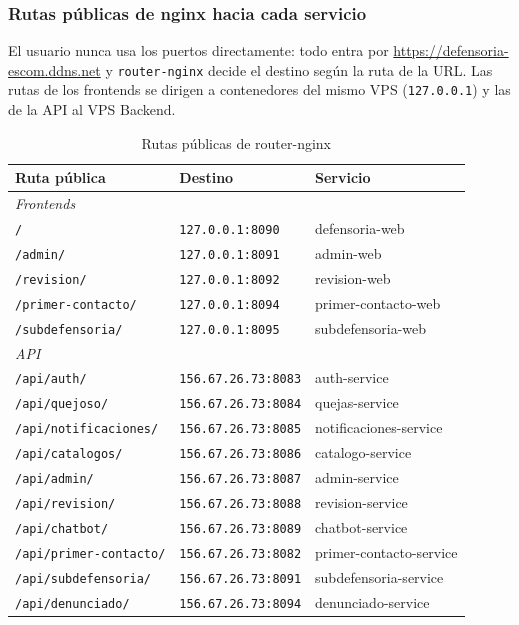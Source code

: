 \subsubsection{Rutas públicas de nginx hacia cada servicio}
El usuario nunca usa los puertos directamente: todo entra por \url{https://defensoria-escom.ddns.net} y \texttt{router-nginx} decide el destino según la ruta de la URL. Las rutas de los frontends se dirigen a contenedores del mismo VPS (\texttt{127.0.0.1}) y las de la API al VPS Backend.

\begin{table}[H]
\centering
\caption{Rutas públicas de router-nginx}
\small
\begin{tabular}{p{4.6cm}p{4.2cm}p{5.2cm}}
\toprule
\textbf{Ruta pública} & \textbf{Destino} & \textbf{Servicio} \\
\midrule
\multicolumn{3}{l}{\textit{Frontends}} \\
\texttt{/} & \texttt{127.0.0.1:8090} & defensoria-web \\
\texttt{/admin/} & \texttt{127.0.0.1:8091} & admin-web \\
\texttt{/revision/} & \texttt{127.0.0.1:8092} & revision-web \\
\texttt{/primer-contacto/} & \texttt{127.0.0.1:8094} & primer-contacto-web \\
\texttt{/subdefensoria/} & \texttt{127.0.0.1:8095} & subdefensoria-web \\
\midrule
\multicolumn{3}{l}{\textit{API}} \\
\texttt{/api/auth/} & \texttt{156.67.26.73:8083} & auth-service \\
\texttt{/api/quejoso/} & \texttt{156.67.26.73:8084} & quejas-service \\
\texttt{/api/notificaciones/} & \texttt{156.67.26.73:8085} & notificaciones-service \\
\texttt{/api/catalogos/} & \texttt{156.67.26.73:8086} & catalogo-service \\
\texttt{/api/admin/} & \texttt{156.67.26.73:8087} & admin-service \\
\texttt{/api/revision/} & \texttt{156.67.26.73:8088} & revision-service \\
\texttt{/api/chatbot/} & \texttt{156.67.26.73:8089} & chatbot-service \\
\texttt{/api/primer-contacto/} & \texttt{156.67.26.73:8082} & primer-contacto-service \\
\texttt{/api/subdefensoria/} & \texttt{156.67.26.73:8091} & subdefensoria-service \\
\texttt{/api/denunciado/} & \texttt{156.67.26.73:8094} & denunciado-service \\
\bottomrule
\end{tabular}
\end{table}

